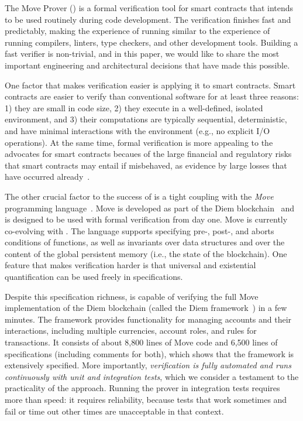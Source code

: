 
The Move Prover (\MVP) is a formal verification tool for smart contracts that
intends to be used routinely during code development.  The verification finishes
fast and predictably, making the experience of running \MVP similar to the
experience of running compilers, linters, type checkers, and other development
tools.  Building a fast verifier is non-trivial, and in this paper, we would
like to share the most important engineering and architectural decisions that
have made this possible.

One factor that makes verification easier is applying it to smart contracts.
Smart contracts are easier to verify than conventional software for at least
three reasons: 1) they are small in code size, 2) they execute in a
well-defined, isolated environment, and 3) their computations are typically
sequential, deterministic, and have minimal interactions with the environment
(e.g., no explicit I/O operations).  At the same time, formal verification is
more appealing to the advocates for smart contracts becaues of the large
financial and regulatory risks that smart contracts may entail if misbehaved, as
evidence by large losses that have occurred already~\cite{CONTRACT_VERIFICATION}.

The other crucial factor to the success of \MVP is a tight coupling with the
\emph{Move} programming language~\cite{MOVE_LANG}.  Move is developed as part of
the Diem blockchain~\cite{DIEM} and is designed to be used with formal
verification from day one.  Move is currently co-evolving with \MVP.  The
language supports specifying pre-, post-, and aborts conditions of functions, as
well as invariants over data structures and over the content of the global
persistent memory (i.e., the state of the blockchain).  One feature that makes
verification harder is that universal and existential quantification can be used
freely in specifications.

Despite this specification richness, \MVP is capable of verifying the full Move
implementation of the Diem blockchain (called the Diem
framework~\cite{DIEM_FRAMEWORK}) in a few minutes.  The framework provides
functionality for managing accounts and their interactions, including multiple
currencies, account roles, and rules for transactions.  It consists of about
8,800 lines of Move code and 6,500 lines of specifications (including comments
for both), which shows that the framework is extensively specified.  More
importantly, \emph{verification is fully automated and runs continuously with
  unit and integration tests}, which we consider a testament to the practicality
of the approach.  Running the prover in integration tests requires more than
speed: it requires reliability, because tests that work sometimes and fail or
time out other times are unacceptable in that context.

